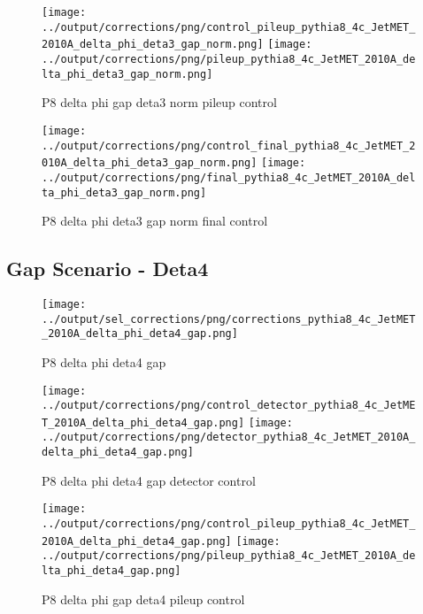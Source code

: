 \documentclass[11pt]{book}
\begin{document}
\begin{figure}[ht]
\centering
\texttt{[image: ../output/corrections/png/control\_pileup\_pythia8\_4c\_JetMET\_2010A\_delta\_phi\_deta3\_gap\_norm.png]}
\texttt{[image: ../output/corrections/png/pileup\_pythia8\_4c\_JetMET\_2010A\_delta\_phi\_deta3\_gap\_norm.png]}
\caption{P8 delta phi gap deta3 norm pileup control}
\label{fig:p8_JetMET_2010A_delta_phi_deta3_gap_norm_pileup_control}
\end{figure}


\begin{figure}[ht]
\centering
\texttt{[image: ../output/corrections/png/control\_final\_pythia8\_4c\_JetMET\_2010A\_delta\_phi\_deta3\_gap\_norm.png]}
\texttt{[image: ../output/corrections/png/final\_pythia8\_4c\_JetMET\_2010A\_delta\_phi\_deta3\_gap\_norm.png]}
\caption{P8 delta phi deta3 gap norm final control}
\label{fig:p8_JetMET_2010A_delta_phi_deta3_gap_norm_final_control}
\end{figure}


\clearpage
\subsection{Gap Scenario - Deta4}
\begin{figure}[ht]
\centering
\texttt{[image: ../output/sel\_corrections/png/corrections\_pythia8\_4c\_JetMET\_2010A\_delta\_phi\_deta4\_gap.png]}
\caption{P8 delta phi deta4 gap}
\label{fig:p8_JetMET_2010A_delta_phi_deta4_gap}
\end{figure}

\begin{figure}[ht]
\centering
\texttt{[image: ../output/corrections/png/control\_detector\_pythia8\_4c\_JetMET\_2010A\_delta\_phi\_deta4\_gap.png]}
\texttt{[image: ../output/corrections/png/detector\_pythia8\_4c\_JetMET\_2010A\_delta\_phi\_deta4\_gap.png]}
\caption{P8 delta phi deta4 gap detector control}
\label{fig:p8_JetMET_2010A_delta_phi_deta4_gap_detector_control}
\end{figure}

\begin{figure}[ht]
\centering
\texttt{[image: ../output/corrections/png/control\_pileup\_pythia8\_4c\_JetMET\_2010A\_delta\_phi\_deta4\_gap.png]}
\texttt{[image: ../output/corrections/png/pileup\_pythia8\_4c\_JetMET\_2010A\_delta\_phi\_deta4\_gap.png]}
\caption{P8 delta phi gap deta4 pileup control}
\label{fig:p8_JetMET_2010A_delta_phi_deta4_gap_pileup_control}
\end{figure}
\end{document}
